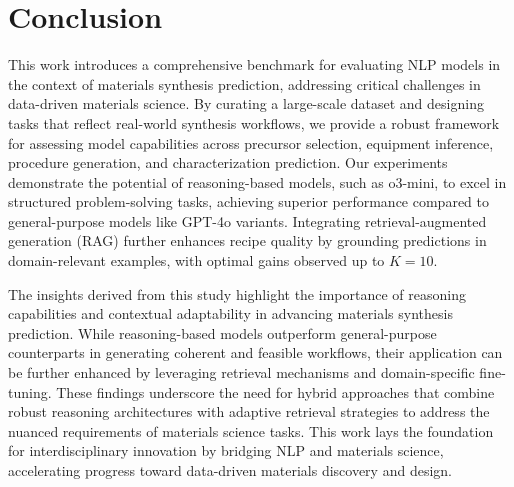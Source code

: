 \section{Conclusion}
\label{sec:conclusion}

This work introduces a comprehensive benchmark for evaluating NLP models in the context of materials synthesis prediction, addressing critical challenges in data-driven materials science. By curating a large-scale dataset and designing tasks that reflect real-world synthesis workflows, we provide a robust framework for assessing model capabilities across precursor selection, equipment inference, procedure generation, and characterization prediction. Our experiments demonstrate the potential of reasoning-based models, such as o3-mini, to excel in structured problem-solving tasks, achieving superior performance compared to general-purpose models like GPT-4o variants. Integrating retrieval-augmented generation (RAG) further enhances recipe quality by grounding predictions in domain-relevant examples, with optimal gains observed up to \(K=10\).

The insights derived from this study highlight the importance of reasoning capabilities and contextual adaptability in advancing materials synthesis prediction. While reasoning-based models outperform general-purpose counterparts in generating coherent and feasible workflows, their application can be further enhanced by leveraging retrieval mechanisms and domain-specific fine-tuning. These findings underscore the need for hybrid approaches that combine robust reasoning architectures with adaptive retrieval strategies to address the nuanced requirements of materials science tasks. This work lays the foundation for interdisciplinary innovation by bridging NLP and materials science, accelerating progress toward data-driven materials discovery and design.

